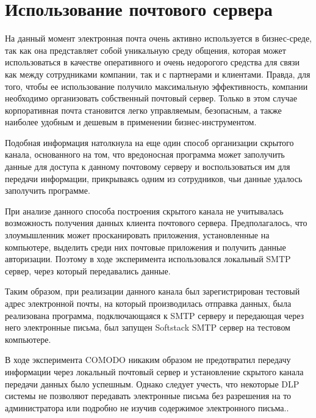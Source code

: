 \section{Использование почтового сервера}

На данный момент электронная почта очень активно используется в бизнес-среде, так как она представляет собой уникальную среду общения, которая может использоваться в качестве оперативного и очень недорогого средства для связи как между сотрудниками компании, так и с партнерами и клиентами. Правда, для того, чтобы ее использование получило максимальную эффективность, компании необходимо организовать собственный почтовый сервер. Только в этом случае корпоративная почта становится легко управляемым, безопасным, а также наиболее удобным и дешевым в применении бизнес-инструментом.

Подобная информация натолкнула на еще один способ организации скрытого канала, основанного на том, что вредоносная программа может заполучить данные для доступа к данному почтовому серверу и воспользоваться им для передачи информации, прикрываясь одним из сотрудников, чьи данные удалось заполучить программе.

При анализе данного способа построения скрытого канала не учитывалась возможность получения данных клиента почтового сервера. Предполагалось, что злоумышленник может просканировать приложения, установленные на компьютере, выделить среди них почтовые приложения и получить данные авторизации. Поэтому в ходе эксперимента использовался локальный SMTP сервер, через который передавались данные. 

Таким образом, при реализации данного канала был зарегистрирован тестовый адрес электронной почты, на который производилась отправка данных, была реализована программа, подключающаяся к SMTP серверу и передающая через него электронные письма, был запущен Softstack SMTP сервер на тестовом компьютере.

В ходе эксперимента COMODO никаким образом не предотвратил передачу информации через локальный почтовый сервер и установление скрытого канала передачи данных было успешным. Однако следует учесть, что некоторые DLP системы не позволяют передавать электронные письма без разрешения на то администратора или подробно не изучив содержимое электронного письма..



